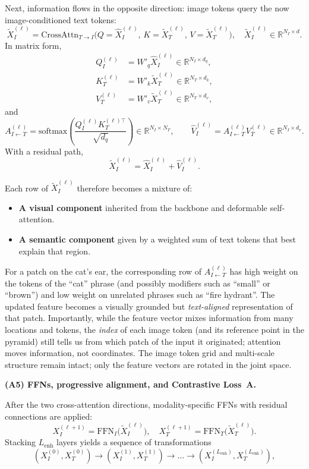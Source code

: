 \begin{enrichment}
\begin{enrichment}[Method][subsection]
		Next, information flows in the opposite direction: image tokens query the now image-conditioned text tokens:
		\[
		\tilde{X}_I^{(\ell)} = \text{CrossAttn}_{T \rightarrow I}\bigl(Q = \hat{X}_I^{(\ell)},\, K = \tilde{X}_T^{(\ell)},\, V = \tilde{X}_T^{(\ell)}\bigr), \quad \tilde{X}_I^{(\ell)} \in \mathbb{R}^{N_I \times d}.
		\]
		In matrix form,
		\begin{align*}
			Q_I^{(\ell)} &= W'_q \hat{X}_I^{(\ell)} \in \mathbb{R}^{N_I \times d_q},\\
			K_T^{(\ell)} &= W'_k \tilde{X}_T^{(\ell)} \in \mathbb{R}^{N_T \times d_k},\\
			V_T^{(\ell)} &= W'_v \tilde{X}_T^{(\ell)} \in \mathbb{R}^{N_T \times d_v},
		\end{align*}
		and
		\[
		A_{I \leftarrow T}^{(\ell)} = \text{softmax}\!\left(\frac{Q_I^{(\ell)} K_T^{(\ell)\top}}{\sqrt{d_q}}\right) \in \mathbb{R}^{N_I \times N_T},
		\qquad
		\hat{V}_I^{(\ell)} = A_{I \leftarrow T}^{(\ell)} V_T^{(\ell)} \in \mathbb{R}^{N_I \times d_v}.
		\]
		With a residual path,
		\[
		\tilde{X}_I^{(\ell)} = \hat{X}_I^{(\ell)} + \hat{V}_I^{(\ell)}.
		\]
		
		Each row of \(\tilde{X}_I^{(\ell)}\) therefore becomes a mixture of:
		\begin{itemize}
			\item \textbf{A visual component} inherited from the backbone and deformable self-attention.
			\item \textbf{A semantic component} given by a weighted sum of text tokens that best explain that region.
		\end{itemize}
		For a patch on the cat’s ear, the corresponding row of \(A_{I \leftarrow T}^{(\ell)}\) has high weight on the tokens of the ``cat'' phrase (and possibly modifiers such as ``small'' or ``brown'') and low weight on unrelated phrases such as ``fire hydrant''. The updated feature becomes a visually grounded but \emph{text-aligned} representation of that patch. Importantly, while the feature vector mixes information from many locations and tokens, the \emph{index} of each image token (and its reference point in the pyramid) still tells us from which patch of the input it originated; attention moves information, not coordinates. The image token grid and multi-scale structure remain intact; only the feature vectors are rotated in the joint space.
		
		\noindent\textbf{(A5) FFNs, progressive alignment, and Contrastive Loss~A.}
		
		After the two cross-attention directions, modality-specific FFNs with residual connections are applied:
		\[
		X_I^{(\ell+1)} = \text{FFN}_I\bigl(\tilde{X}_I^{(\ell)}\bigr), \quad
		X_T^{(\ell+1)} = \text{FFN}_T\bigl(\tilde{X}_T^{(\ell)}\bigr).
		\]
		Stacking \(L_{\text{enh}}\) layers yields a sequence of transformations
		\[
		(X_I^{(0)}, X_T^{(0)}) \rightarrow (X_I^{(1)}, X_T^{(1)}) \rightarrow \dots \rightarrow (X_I^{(L_{\text{enh}})}, X_T^{(L_{\text{enh}})}),
		\]
		

\end{enrichment}
\end{enrichment}
